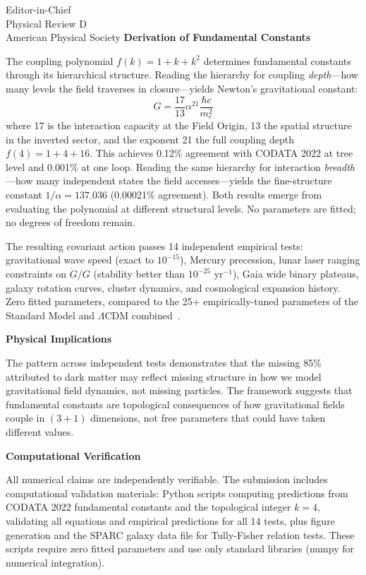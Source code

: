 \documentclass[11pt]{letter}
\begin{document}
\begin{letter}{%
Editor-in-Chief\\
Physical Review D\\
American Physical Society
}
\textbf{Derivation of Fundamental Constants}

The coupling polynomial $f(k) = 1 + k + k^2$ determines fundamental constants through its hierarchical structure. Reading the hierarchy for coupling \emph{depth}---how many levels the field traverses in closure---yields Newton's gravitational constant:
\begin{equation*}
G = \frac{17}{13}\alpha^{21} \frac{\hbar c}{m_e^2}
\end{equation*}
where 17 is the interaction capacity at the Field Origin, 13 the spatial structure in the inverted sector, and the exponent 21 the full coupling depth $f(4) = 1 + 4 + 16$. This achieves 0.12\% agreement with CODATA 2022 at tree level and 0.001\% at one loop. Reading the same hierarchy for interaction \emph{breadth}---how many independent states the field accesses---yields the fine-structure constant $1/\alpha = 137.036$ (0.00021\% agreement). Both results emerge from evaluating the polynomial at different structural levels. No parameters are fitted; no degrees of freedom remain.

The resulting covariant action passes 14 independent empirical tests: gravitational wave speed (exact to $10^{-15}$), Mercury precession, lunar laser ranging constraints on $\dot{G}/G$ (stability better than $10^{-25}$ yr$^{-1}$), Gaia wide binary plateaus, galaxy rotation curves, cluster dynamics, and cosmological expansion history. Zero fitted parameters, compared to the 25+ empirically-tuned parameters of the Standard Model and $\Lambda$CDM combined~\cite{pdg2024}.

\textbf{Physical Implications}

The pattern across independent tests demonstrates that the missing 85\% attributed to dark matter may reflect missing structure in how we model gravitational field dynamics, not missing particles. The framework suggests that fundamental constants are topological consequences of how gravitational fields couple in $(3+1)$ dimensions, not free parameters that could have taken different values.

\textbf{Computational Verification}

All numerical claims are independently verifiable. The submission includes computational validation materials: Python scripts computing predictions from CODATA 2022 fundamental constants and the topological integer $k = 4$, validating all equations and empirical predictions for all 14 tests, plus figure generation and the SPARC galaxy data file for Tully-Fisher relation tests. These scripts require zero fitted parameters and use only standard libraries (numpy for numerical integration).


\end{letter}
\end{document}
